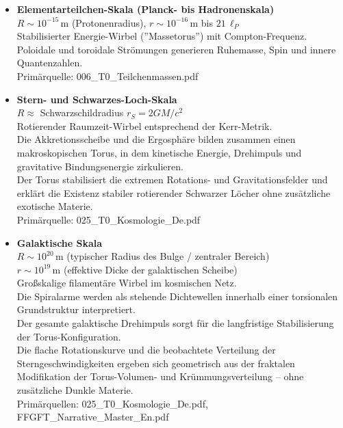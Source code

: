 	\begin{itemize}
		\item \textbf{Elementarteilchen-Skala (Planck- bis Hadronenskala)} \\
		$R \sim 10^{-15}\,\text{m}$ (Protonenradius), $r \sim 10^{-16}\,\text{m}$ bis $21\,\ell_P$ \\
		Stabilisierter Energie-Wirbel (''Massetorus'') mit Compton-Frequenz. \\
		Poloidale und toroidale Strömungen generieren Ruhemasse, Spin und innere Quantenzahlen. \\
		Primärquelle: 006\_T0\_Teilchenmassen.pdf
		
		\item \textbf{Stern- und Schwarzes-Loch-Skala} \\
		$R \approx$ Schwarzschildradius $r_S = 2GM/c^2$ \\
		Rotierender Raumzeit-Wirbel entsprechend der Kerr-Metrik. \\
		Die Akkretionsscheibe und die Ergosphäre bilden zusammen einen makroskopischen Torus, in dem kinetische Energie, Drehimpuls und gravitative Bindungsenergie zirkulieren. \\
		Der Torus stabilisiert die extremen Rotations- und Gravitationsfelder und erklärt die Existenz stabiler rotierender Schwarzer Löcher ohne zusätzliche exotische Materie. \\
		Primärquelle: 025\_T0\_Kosmologie\_De.pdf
		
		\item \textbf{Galaktische Skala} \\
		$R \sim 10^{20}\,\text{m}$ (typischer Radius des Bulge / zentraler Bereich) \\
		$r \sim 10^{19}\,\text{m}$ (effektive Dicke der galaktischen Scheibe) \\
		Großskalige filamentäre Wirbel im kosmischen Netz. \\
		Die Spiralarme werden als stehende Dichtewellen innerhalb einer torsionalen Grundstruktur interpretiert. \\
		Der gesamte galaktische Drehimpuls sorgt für die langfristige Stabilisierung der Torus-Konfiguration. \\
		Die flache Rotationskurve und die beobachtete Verteilung der Sterngeschwindigkeiten ergeben sich geometrisch aus der fraktalen Modifikation der Torus-Volumen- und Krümmungsverteilung – ohne zusätzliche Dunkle Materie. \\
		Primärquellen: 025\_T0\_Kosmologie\_De.pdf, FFGFT\_Narrative\_Master\_En.pdf
		

\end{itemize}
